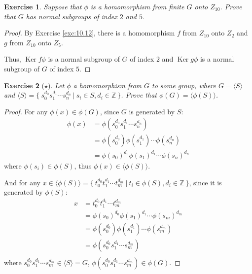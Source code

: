 \documentclass[14pt]{extarticle}
\newtheorem{exercise}{Exercise}[section]
\newcommand{\Z}{\mathbb{Z}}
\newcommand{\1}{\{ e \}}
\newcommand{\set}[2]{\{ \ #1 \ | \ #2 \ \}}
\newcommand{\cyc}[1]{\langle #1 \rangle}
\DeclareMathOperator{\Ker}{Ker}
\begin{document}
\setcounter{exercise}{28}
\begin{exercise}
  Suppose that $\phi$ is a homomorphism from finite $G$ onto $Z_{10}$.
  Prove that $G$ has normal subgroups of index $2$ and $5$.
\end{exercise}
\begin{proof}
  By Exercise \ref{exc:10.12}, there is a homomorphism 
  $f$ from $Z_{10}$ onto $Z_2$ and
  $g$ from $Z_{10}$ onto $Z_5$.

  Thus, $\Ker f \phi$ is a normal subgroup of $G$ of index $2$
  and $\Ker g \phi$ is a normal subgroup of $G$ of index $5$.
\end{proof}

\setcounter{exercise}{47}
\begin{exercise}[$\star$]
  Let $\phi$ a homomorphism from $G$ to some group,
  where $G = \cyc{S}$ and $\cyc{S} = \set{s_0^{d_0} s_1^{d_1} \cdots s_n^{d_n}}{s_i \in S, d_i \in \Z}$.
  Prove that $\phi(G) = \cyc{\phi(S)}$.
\end{exercise}
\begin{proof}
  For any $\phi(x) \in \phi(G)$, since $G$ is generated by $S$:
  \begin{align*}
    \phi(x) &= \phi(s_0^{d_0} s_1^{d_1} \cdots s_n^{d_n}) \\
            &= \phi(s_0^{d_0}) \phi(s_1^{d_1}) \cdots \phi(s_n^{d_n}) \\
            &= \phi(s_0)^{d_0} \phi(s_1)^{d_1} \cdots \phi(s_n)^{d_n}
  \end{align*}
  where $\phi(s_i) \in \phi(S)$,
  thus $\phi(x) \in \cyc{\phi(S)}$.

  And for any $x \in \cyc{\phi(S)} = \set{t_0^{d_0} t_1^{d_1} \cdots t_m^{d_m}}{t_i \in \phi(S), d_i \in \Z}$, 
  since it is generated by $\phi(S)$:
  \begin{align*}
    x &= t_0^{d_0} t_1^{d_1} \cdots t_m^{d_m} \\
      &= \phi(s_0)^{d_0} \phi(s_1)^{d_1} \cdots \phi(s_m)^{d_m} \\
      &= \phi(s_0^{d_0}) \phi(s_1^{d_1}) \cdots \phi(s_m^{d_m}) \\
      &= \phi(s_0^{d_0} s_1^{d_1} \cdots s_m^{d_m}) \\
  \end{align*}
  where $s_0^{d_0} s_1^{d_1} \cdots s_m^{d_m} \in \cyc{S} = G$, $\phi(s_0^{d_0} s_1^{d_1} \cdots s_m^{d_m}) \in \phi(G)$.
\end{proof}
\end{document}
